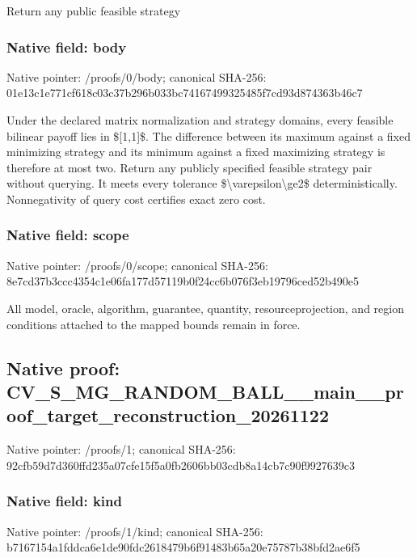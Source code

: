 \documentclass[10pt,a4paper]{article}
\begin{document}
Return any public feasible strategy


\subsubsection{Native field: body}


Native pointer: /proofs/0/body; canonical SHA-256: 01e13c1e771cf618c03c37b2\allowbreak{}96b033bc74167499325485f7\allowbreak{}cd93d874363b46c7


Under the declared matrix normalization and strategy domains, every feasible bilinear payoff lies in \$[1,1]\$. The difference between its maximum against a fixed minimizing strategy and its minimum against a fixed maximizing strategy is therefore at most two. Return any publicly specified feasible strategy pair without querying. It meets every tolerance \$\textbackslash{}varepsilon\textbackslash{}ge2\$ deterministically. Nonnegativity of query cost certifies exact zero cost.


\subsubsection{Native field: scope}


Native pointer: /proofs/0/scope; canonical SHA-256: 8e7cd37b3ccc4354c1e06fa1\allowbreak{}77d57119b0f24cc6b076f3eb\allowbreak{}19796ced52b490e5


All model, oracle, algorithm, guarantee, quantity, resourceprojection, and region conditions attached to the mapped bounds remain in force.


\subsection{Native proof: CV\_S\_MG\_RANDOM\_BALL\_\_mai\allowbreak{}n\_\_proof\_target\_reconstr\allowbreak{}uction\_20261122}


Native pointer: /proofs/1; canonical SHA-256: 92cfb59d7d360ffd235a07cf\allowbreak{}e15f5a0fb2606bb03cdb8a14\allowbreak{}cb7c90f9927639c3



\subsubsection{Native field: kind}


Native pointer: /proofs/1/kind; canonical SHA-256: b7167154a1fddca6e1de90fd\allowbreak{}c2618479b6f91483b65a20e7\allowbreak{}5787b38bfd2ae6f5
\end{document}
